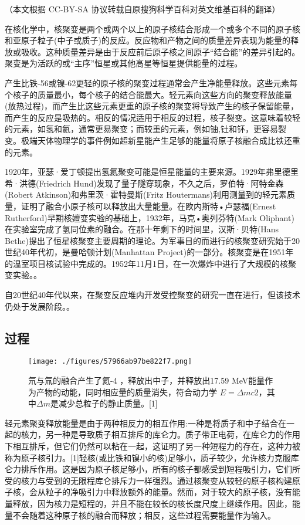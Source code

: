 
（本文根据 CC-BY-SA 协议转载自原搜狗科学百科对英文维基百科的翻译）

在核化学中，核聚变是两个或两个以上的原子核结合形成一个或多个不同的原子核和亚原子粒子(中子或质子)的反应。反应物和产物之间的质量差异表现为能量的释放或吸收。这种质量差异是由于反应前后原子核之间原子“结合能”的差异引起的。聚变是为活跃的或“主序”恒星或其他高星等恒星提供能量的过程。

产生比铁-56或镍-62更轻的原子核的聚变过程通常会产生净能量释放。这些元素每个核子的质量最小，每个核子的结合能最大。轻元素向这些方向的聚变释放能量(放热过程)，而产生比这些元素更重的原子核的聚变将导致产生的核子保留能量，而产生的反应是吸热的。相反的情况适用于相反的过程，核子裂变。这意味着较轻的元素，如氢和氦，通常更易聚变；而较重的元素，例如铀,钍和钚，更容易裂变。极端天体物理学的事件例如超新星能产生足够的能量将原子核融合成比铁还重的元素。

1920年，亚瑟·爱丁顿提出氢氦聚变可能是恒星能量的主要来源。1929年弗里德里希·洪德(Friedrich Hund)发现了量子隧穿现象，不久之后，罗伯特·阿特金森(Robert Atkinson)和弗里茨·霍特曼斯(Fritz Houtermans)利用测量到的轻元素质量，证明了融合小原子核可以释放出大量能量。在欧内斯特•卢瑟福(Ernest Rutherford)早期核嬗变实验的基础上，1932年，马克•奥列芬特(Mark Oliphant)在实验室完成了氢同位素的融合。在那十年剩下的时间里，汉斯·贝特(Hans Bethe)提出了恒星核聚变主要周期的理论。为军事目的而进行的核聚变研究始于20世纪40年代初，是曼哈顿计划(Manhattan Project)的一部分。核聚变是在1951年的温室项目核试验中完成的。1952年11月1日，在一次爆炸中进行了大规模的核聚变实验。。

自20世纪40年代以来，在聚变反应堆内开发受控聚变的研究一直在进行，但该技术仍处于发展阶段。。

\subsection{过程}
\begin{figure}[ht]
\centering
\texttt{[image: ./figures/57966ab97be822f7.png]}
\caption{氘与氚的融合产生了氦-4 ，释放出中子，并释放出17.59 MeV能量作为产物的动能，同时相应量的质量消失，符合动力学 $E = \Delta mc2$，其中$\Delta m$是减少总粒子的静止质量。[1]} \label{fig_HJB_1}
\end{figure}

轻元素聚变释放能量是由于两种相反力的相互作用:一种是将质子和中子结合在一起的核力，另一种是导致质子相互排斥的库仑力。质子带正电荷，在库仑力的作用下相互排斥，但它们仍然可以粘在一起，这证明了另一种短程力的存在，这种力被称为原子核引力。[1]轻核(或比铁和镍小的核)足够小，质子较少，允许核力克服库仑力排斥作用。这是因为原子核足够小，所有的核子都感受到短程吸引力，它们所受的核力与受到的无限程库仑排斥力一样强烈。通过核聚变从较轻的原子核构建原子核，会从粒子的净吸引力中释放额外的能量。然而，对于较大的原子核，没有能量释放，因为核力是短程的，并且不能在较长的核长度尺度上继续作用。因此，能量不会随着这种原子核的融合而释放；相反，这些过程需要能量作为输入。

